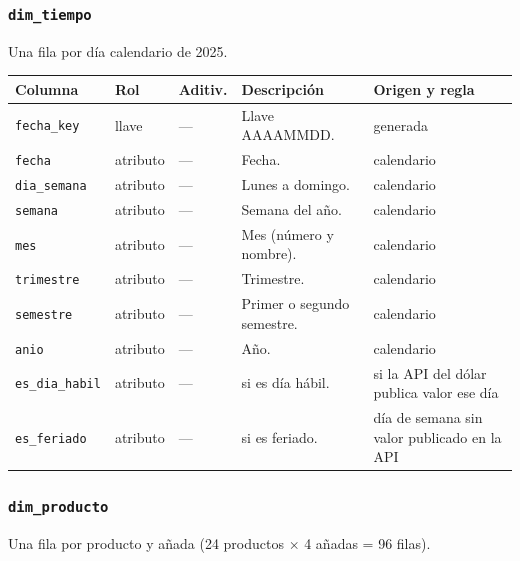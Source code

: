 \subsubsection*{\texttt{dim\_tiempo}}
Una fila por día calendario de 2025.

{\footnotesize
\begin{longtable}{@{}>{\raggedright\arraybackslash}p{}>{\raggedright\arraybackslash}p{}>{\raggedright\arraybackslash}p{}>{\raggedright\arraybackslash}p{}>{\raggedright\arraybackslash}p{}@{}}
\toprule
Columna & Rol & Aditiv. & Descripción & Origen y regla \\
\midrule
\endhead
\texttt{fecha\_key} & llave & — & Llave AAAAMMDD. & generada \\
\texttt{fecha} & atributo & — & Fecha. & calendario \\
\texttt{dia\_semana} & atributo & — & Lunes a domingo. & calendario \\
\texttt{semana} & atributo & — & Semana del año. & calendario \\
\texttt{mes} & atributo & — & Mes (número y nombre). & calendario \\
\texttt{trimestre} & atributo & — & Trimestre. & calendario \\
\texttt{semestre} & atributo & — & Primer o segundo semestre. & calendario \\
\texttt{anio} & atributo & — & Año. & calendario \\
\texttt{es\_dia\_habil} & atributo & — & 1 si es día hábil. & 1 si la API del dólar publica valor ese día \\
\texttt{es\_feriado} & atributo & — & 1 si es feriado. & día de semana sin valor publicado en la API \\
\bottomrule
\end{longtable}
}

\subsubsection*{\texttt{dim\_producto}}
Una fila por producto y añada (24 productos $\times$ 4 añadas = 96 filas).

